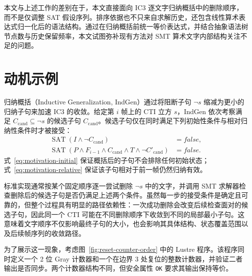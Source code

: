\documentclass[11pt,a4paper]{article}
\newcommand{\Sat}{\operatorname{SAT}}
\begin{document}
本文与上述工作的差别在于，本文直接面向 IC3 逐文字归纳概括中的删除顺序，而不是仅调整 SAT 假设序列。排序依据也不只来自求解历史，还包含线性算术表达式归一化后的语法结构。通过在归纳概括前统一等价表达式，并结合抽象语法树节点数与历史保留频率，本文试图弥补现有方法对 SMT 算术文字内部结构关注不足的问题。

\section{动机示例}
\label{sec:motivation-example}

归纳概括（Inductive Generalization, IndGen）通过将阻断子句 $\neg s$ 缩减为更小的归纳子句来加速 IC3 的收敛。给定第 $i$ 帧上的 CTI 立方 $s$，IndGen 依次考察满足 $C_{\mathrm{cand}}\subseteq\neg s$ 的候选子句 $C_{\mathrm{cand}}$。候选子句仅在同时满足下列初始性条件与相对归纳性条件时才被接受：
\begin{align}
  \Sat\!\left(I\land\neg C_{\mathrm{cand}}\right)
    &=\mathit{false}, \label{eq:motivation-initial}\\
  \Sat\!\left(P\land F_{i-1}\land C_{\mathrm{cand}}\land T\land
    \neg C'_{\mathrm{cand}}\right)
    &=\mathit{false}. \label{eq:motivation-relative}
\end{align}
式~\eqref{eq:motivation-initial} 保证概括后的子句不会排除任何初始状态；式~\eqref{eq:motivation-relative} 保证该子句相对于前一帧仍然归纳有效。

标准实现通常按某个固定顺序逐一尝试删除 $\neg s$ 中的文字，并调用 SMT 求解器检查删除后的候选子句是否仍满足上述两个条件。虽然每一步的接受条件是确定且可靠的，但整个过程具有明显的路径依赖性：一次成功删除会改变后续检查面对的候选子句，因此同一个 CTI 可能在不同删除顺序下收敛到不同的局部最小子句。这意味着文字顺序不仅影响最终子句的大小，也会影响其具体结构、状态覆盖范围以及后续帧序列的收敛路径。

为了展示这一现象，考虑图~\ref{fig:reset-counter-order} 中的 Lustre 程序。该程序同时定义一个 2 位 Gray 计数器和一个在边界 3 处复位的整数计数器，并验证二者输出是否同步。两个计数器结构不同，但安全属性 \texttt{OK} 要求其输出保持等价。
\end{document}
